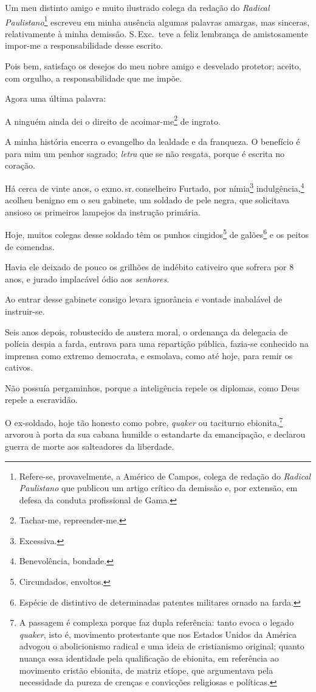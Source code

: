 Um meu distinto amigo e muito ilustrado colega da redação do
\emph{Radical Paulistano}\footnote{Refere-se, provavelmente, a Américo
  de Campos, colega de redação do \emph{Radical Paulistano} que publicou
  um artigo crítico da demissão e, por extensão, em defesa da conduta
  profissional de Gama.} escreveu em minha ausência algumas palavras
amargas, mas sinceras, relativamente à minha demissão. S.\,Exc.~teve a
feliz lembrança de amistosamente impor-me a responsabilidade desse
escrito.

Pois bem, satisfaço os desejos do meu nobre amigo e desvelado protetor;
aceito, com orgulho, a responsabilidade que me impõe.

Agora uma última palavra:

A ninguém ainda dei o direito de acoimar-me\footnote{Tachar-me,
  repreender-me.} de ingrato.

A minha história encerra o evangelho da lealdade e da franqueza. O
benefício é para mim um penhor sagrado; \emph{letra} que se não resgata,
porque é escrita no coração.

Há cerca de vinte anos, o exmo.\,sr.\,conselheiro Furtado, por
nímia\footnote{Excessiva.} indulgência,\footnote{Benevolência,
  bondade.} acolheu benigno em o seu gabinete, um soldado de pele
negra, que solicitava ansioso os primeiros lampejos da instrução
primária.

Hoje, muitos colegas desse soldado têm os punhos cingidos\footnote{
  Circundados, envoltos.} de galões\footnote{Espécie de distintivo de
  determinadas patentes militares ornado na farda.} e os peitos de
comendas.

Havia ele deixado de pouco os grilhões de indébito cativeiro que sofrera
por 8 anos, e jurado implacável ódio aos \emph{senhores}.

Ao entrar desse gabinete consigo levara ignorância e vontade inabalável
de instruir-se.

Seis anos depois, robustecido de austera moral, o ordenança da delegacia
de polícia despia a farda, entrava para uma repartição pública, fazia-se
conhecido na imprensa como extremo democrata, e esmolava, como até hoje,
para remir os cativos.

Não possuía pergaminhos, porque a inteligência repele os diplomas, como
Deus repele a escravidão.

O ex-soldado, hoje tão honesto como pobre, \emph{quaker} ou taciturno
ebionita,\footnote{A passagem é complexa porque faz dupla referência:
  tanto evoca o legado \emph{quaker}, isto é, movimento protestante que nos
  Estados Unidos da América advogou o abolicionismo radical e uma ideia
  de cristianismo original; quanto nuança essa identidade pela
  qualificação de ebionita, em referência ao movimento cristão ebionita,
  de matriz etíope, que argumentava pela necessidade da pureza de
  crenças e convicções religiosas e políticas.} arvorou à porta da sua
cabana humilde o estandarte da emancipação, e declarou guerra de morte
aos salteadores da liberdade.

